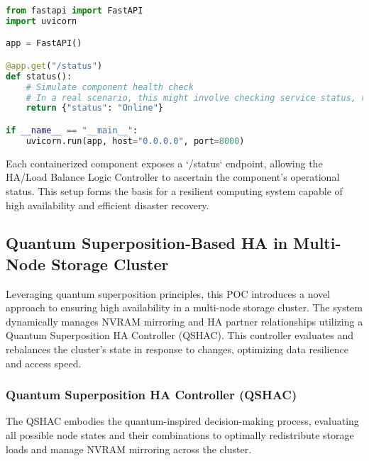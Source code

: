 \documentclass[12pt]{article}
\begin{document}
\begin{lstlisting}[language=Python, caption=Docker Container Simulation for System Components]
from fastapi import FastAPI
import uvicorn

app = FastAPI()

@app.get("/status")
def status():
    # Simulate component health check
    # In a real scenario, this might involve checking service status, resource usage, etc.
    return {"status": "Online"}

if __name__ == "__main__":
    uvicorn.run(app, host="0.0.0.0", port=8000)
\end{lstlisting}

Each containerized component exposes a `/status` endpoint, allowing the HA/Load Balance Logic Controller to ascertain the component's operational status. This setup forms the basis for a resilient computing system capable of high availability and efficient disaster recovery.


\subsection{Quantum Superposition-Based HA in Multi-Node Storage Cluster}

Leveraging quantum superposition principles, this POC introduces a novel approach to ensuring high availability in a multi-node storage cluster. The system dynamically manages NVRAM mirroring and HA partner relationships utilizing a Quantum Superposition HA Controller (QSHAC). This controller evaluates and rebalances the cluster's state in response to changes, optimizing data resilience and access speed.

\subsubsection{Quantum Superposition HA Controller (QSHAC)}

The QSHAC embodies the quantum-inspired decision-making process, evaluating all possible node states and their combinations to optimally redistribute storage loads and manage NVRAM mirroring across the cluster.
\end{document}
